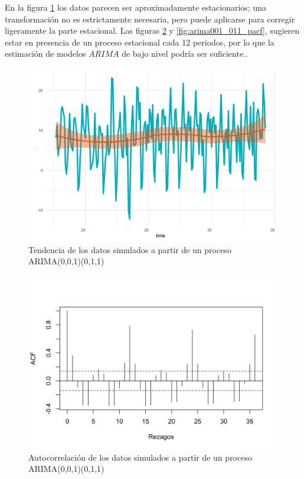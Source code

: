 \documentclass[
]{article}
\begin{document}
En la figura \ref{fig:arima001_011_comportamiento} los datos parecen ser
aproximadamente estacionarios; una transformación no es estrictamente
necesaria, pero puede aplicarse para corregir ligeramente la parte
estacional. Las figuras \ref{fig:arima001_011_acf} y
\ref{fig:arima001_011_pacf}, sugieren estar en presencia de un proceso
estacional cada 12 periodos, por lo que la estimación de modelos
\(ARIMA\) de bajo nivel podría ser suficiente..

\begin{figure}[H]
\includegraphics[width=1\linewidth,height=1\textheight]{Tesis_files/figure-latex/arima001_011_comportamiento-1} \caption{Tendencia de los datos simulados a partir de un proceso ARIMA(0,0,1)(0,1,1)}\label{fig:arima001_011_comportamiento}
\end{figure}

\begin{figure}[H]
\includegraphics[width=1\linewidth,height=1\textheight]{Tesis_files/figure-latex/arima001_011_acf-1} \caption{Autocorrelación de los datos simulados a partir de un proceso ARIMA(0,0,1)(0,1,1)}\label{fig:arima001_011_acf}
\end{figure}
\end{document}
